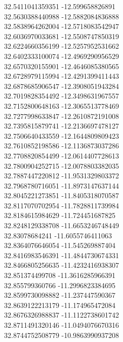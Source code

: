 {32.5411041359351	-12.599658826891\\
32.5630388440988	-12.5882084836888\\
32.5838964262004	-12.5718083542947\\
32.6036970033681	-12.5508747850319\\
32.6224660356199	-12.5257952531662\\
32.6402333100074	-12.4969290956529\\
32.6570320155901	-12.4646085380565\\
32.6728979115994	-12.4291399411443\\
32.6878685906547	-12.3908051943284\\
32.7019828354492	-12.3498631967557\\
32.7152800648163	-12.3065513778469\\
32.7277998633847	-12.2610872191008\\
32.7395815879741	-12.2136697478127\\
32.7506640433559	-12.1644809809423\\
32.7610852198586	-12.1136873037286\\
32.7708820854499	-12.0614407728613\\
32.7800904252715	-12.0078803382035\\
32.7887447220812	-11.9531329803372\\
32.7968780716051	-11.8973147637144\\
32.8045221273851	-11.8405318070587\\
32.8117070702954	-11.7828811739984\\
32.8184615984629	-11.724451687825\\
32.8248129338708	-11.6653246748449\\
32.83078684241	-11.6055746411063\\
32.8364076646054	-11.545269887404\\
32.8416983546391	-11.4844730674331\\
32.8466805256635	-11.4232416938307\\
32.851374499708	-11.3616285966391\\
32.855799360766	-11.2996823384695\\
32.8599730098882	-11.237447590367\\
32.8639122213179	-11.174965472084\\
32.8676326988837	-11.1122738601742\\
32.8711491320146	-11.0494076670316\\
32.8744752508779	-10.9863990937208\\
}
